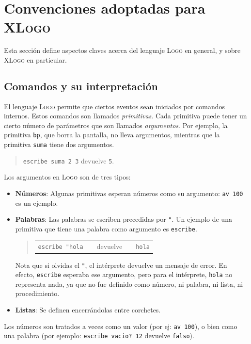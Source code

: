 \chapter{Convenciones  adoptadas para \textsc{XLogo}}
   \label{Convenciones-XLogo}

Esta secci\'on define aspectos claves acerca del lenguaje \textsc{Logo}
en general, y sobre \textsc{XLogo} en particular.

\section{Comandos  y su interpretaci\'on}
   \label{Comandos}

El lenguaje \textsc{Logo} permite que ciertos eventos sean iniciados
por comandos internos. Estos comandos son llamados
\textit{primitivas}. Cada primitiva puede tener un
cierto n\'umero de par\'ametros que son llamados
\textit{argumentos}. Por ejemplo, la primitiva
\texttt{bp}, que borra la pantalla, no lleva argumentos, mientras
que la primitiva \texttt{suma} tiene dos argumentos.
\begin{quote}
   \texttt{escribe suma 2 3} devuelve \texttt{5}.
\end{quote}
Los argumentos en \textsc{Logo} son de tres tipos:
\begin{itemize}
   \item \textbf{N\'umeros}:  Algunas primitivas esperan
      n\'umeros como su argumento: \texttt{av 100} es un ejemplo.
   \item \textbf{Palabras}:  Las palabras se escriben
      precedidas por \verb+"+. Un ejemplo de una primitiva que tiene una
      palabra como argumento es \texttt{escribe}. 
      \begin{quote}
         \begin{tabular}{lcccl}
            \verb+escribe "hola+ & & devuelve & & \texttt{hola}
         \end{tabular}
      \end{quote}
      \noindent Nota que si olvidas el \verb+"+, el int\'erprete devuelve
      un mensaje de error. En efecto, \texttt{escribe} esperaba ese argumento,
      pero para el int\'erprete, \texttt{hola} no representa nada, ya que
      no fue definido como n\'umero, ni palabra, ni lista, ni procedimiento. 
   \item \textbf{Listas}:  Se definen encerr\'andolas entre
      corchetes.
\end{itemize}
Los n\'umeros son tratados a veces como un valor (por ej: \texttt{av 100}),
o bien como una palabra (por ejemplo: \texttt{escribe vacio? 12}
devuelve \texttt{falso}). \\

